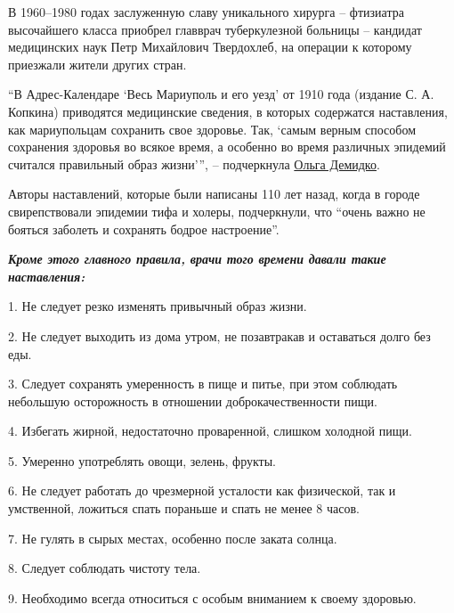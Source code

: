 В 1960–1980 годах заслуженную славу уникального хирурга – фтизиатра высочайшего
класса приобрел главврач туберкулезной больницы – кандидат медицинских наук
Петр Михайлович Твердохлеб, на операции к которому приезжали жители других
стран.

\enquote{В Адрес-Календаре \enquote{Весь Мариуполь и его уезд} от 1910 года (издание С. А.
Копкина) приводятся медицинские сведения, в которых содержатся наставления, как
мариупольцам сохранить свое здоровье. Так, \enquote{самым верным способом сохранения
здоровья во всякое время, а особенно во время различных эпидемий считался
правильный образ жизни}}, – подчеркнула \href{\urlDemidkoIA}{Ольга Демидко}.

Авторы наставлений, которые были написаны 110 лет назад, когда в городе
свирепствовали эпидемии тифа и холеры, подчеркнули, что \enquote{очень важно не бояться
заболеть и сохранять бодрое настроение}.

\emph{\textbf{Кроме этого главного правила, врачи того времени давали такие наставления:}}

\begingroup
\em

1. Не следует резко изменять привычный образ жизни.

2. Не следует выходить из дома утром, не позавтракав и оставаться долго без еды.

3. Следует сохранять умеренность в пище и питье, при этом соблюдать небольшую
осторожность в отношении доброкачественности пищи.

4. Избегать жирной, недостаточно проваренной, слишком холодной пищи.

5. Умеренно употреблять овощи, зелень, фрукты.

6. Не следует работать до чрезмерной усталости как физической, так и
умственной, ложиться спать пораньше и спать не менее 8 часов.

7. Не гулять в сырых местах, особенно после заката солнца.

8. Следует соблюдать чистоту тела.

9. Необходимо всегда относиться с особым вниманием к своему здоровью.

\endgroup
